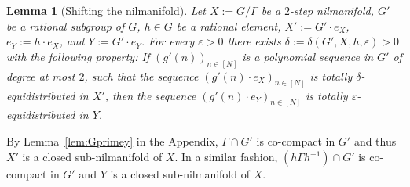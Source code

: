\documentclass[11pt]{amsart}
\newtheorem{lemma}{Lemma}[section]
\theoremstyle{definition}
\begin{document}
\begin{lemma}[Shifting the nilmanifold]
\label{lem:equid_conjug} Let $X:=G/\Gamma$ be a $2$-step
nilmanifold, $G'$ be a rational subgroup of $G$, $h\in G$ be a
rational element, $X':=G'\cdot e_X$, $e_Y:=h\cdot e_X$, and
$Y:=G'\cdot e_Y$.
 For every
 ${\varepsilon}>0$ there exists
$\delta:=\delta(G',X, h,{\varepsilon})>0$ with the following property: If
$(g'(n))_{n\in[N]}$ is a polynomial sequence in $G'$ of degree at
most $2$,  such that the sequence $(g'(n)\cdot e_X)_{ n\in [N]}$ is
totally $\delta$-equidistributed in $X'$, then the sequence
$(g'(n)\cdot e_Y)_{n\in[N]}$ is totally ${\varepsilon}$-equidistributed in
$Y$.
\end{lemma}
By Lemma~\ref{lem:Gprimey} in the Appendix, $\Gamma\cap G'$ is
co-compact in  $G'$  and thus $X'$ is a closed
 sub-nilmanifold of $X$.
In a similar fashion,  $(h\Gamma h{^{-1}})\cap G'$ is co-compact in
$G'$ and $Y$ is a closed sub-nilmanifold of $X$.
\end{document}
